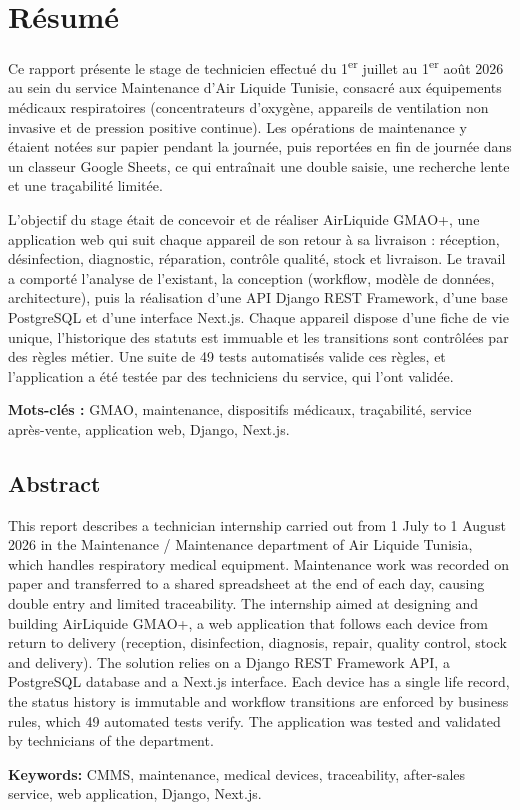 \chapter*{Résumé}

Ce rapport présente le stage de technicien effectué du 1\textsuperscript{er} juillet au 1\textsuperscript{er} août 2026 au sein du service Maintenance d'Air Liquide Tunisie, consacré aux équipements médicaux respiratoires (concentrateurs d'oxygène, appareils de ventilation non invasive et de pression positive continue). Les opérations de maintenance y étaient notées sur papier pendant la journée, puis reportées en fin de journée dans un classeur Google Sheets, ce qui entraînait une double saisie, une recherche lente et une traçabilité limitée.

L'objectif du stage était de concevoir et de réaliser AirLiquide GMAO+, une application web qui suit chaque appareil de son retour à sa livraison : réception, désinfection, diagnostic, réparation, contrôle qualité, stock et livraison. Le travail a comporté l'analyse de l'existant, la conception (workflow, modèle de données, architecture), puis la réalisation d'une API Django REST Framework, d'une base PostgreSQL et d'une interface Next.js. Chaque appareil dispose d'une fiche de vie unique, l'historique des statuts est immuable et les transitions sont contrôlées par des règles métier. Une suite de 49 tests automatisés valide ces règles, et l'application a été testée par des techniciens du service, qui l'ont validée.

\textbf{Mots-clés :} GMAO, maintenance, dispositifs médicaux, traçabilité, service après-vente, application web, Django, Next.js.

\section*{Abstract}

This report describes a technician internship carried out from 1 July to 1 August 2026 in the Maintenance / Maintenance department of Air Liquide Tunisia, which handles respiratory medical equipment. Maintenance work was recorded on paper and transferred to a shared spreadsheet at the end of each day, causing double entry and limited traceability. The internship aimed at designing and building AirLiquide GMAO+, a web application that follows each device from return to delivery (reception, disinfection, diagnosis, repair, quality control, stock and delivery). The solution relies on a Django REST Framework API, a PostgreSQL database and a Next.js interface. Each device has a single life record, the status history is immutable and workflow transitions are enforced by business rules, which 49 automated tests verify. The application was tested and validated by technicians of the department.

\textbf{Keywords:} CMMS, maintenance, medical devices, traceability, after-sales service, web application, Django, Next.js.

